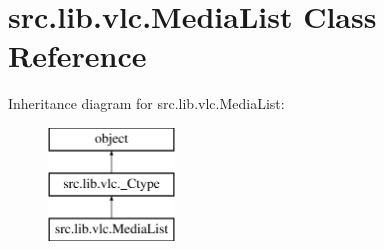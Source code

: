 \hypertarget{classsrc_1_1lib_1_1vlc_1_1MediaList}{}\section{src.\+lib.\+vlc.\+Media\+List Class Reference}
\label{classsrc_1_1lib_1_1vlc_1_1MediaList}
Inheritance diagram for src.\+lib.\+vlc.\+Media\+List\+:\begin{figure}[H]
\begin{center}
\leavevmode
\includegraphics[height=3.000000cm]{classsrc_1_1lib_1_1vlc_1_1MediaList}
\end{center}
\end{figure}

